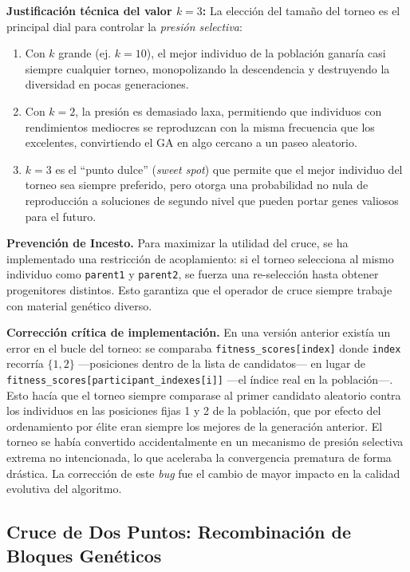 \documentclass[12pt, a4paper]{article}
\begin{document}
\textbf{Justificación técnica del valor $k=3$:} La elección del tamaño del torneo es
el principal dial para controlar la \textit{presión selectiva}:
\begin{enumerate}
    \item Con $k$ grande (ej. $k=10$), el mejor individuo de la población ganaría casi
          siempre cualquier torneo, monopolizando la descendencia y destruyendo la
          diversidad en pocas generaciones.
    \item Con $k=2$, la presión es demasiado laxa, permitiendo que individuos con
          rendimientos mediocres se reproduzcan con la misma frecuencia que los excelentes,
          convirtiendo el GA en algo cercano a un paseo aleatorio.
    \item $k=3$ es el ``punto dulce'' (\textit{sweet spot}) que permite que el mejor
          individuo del torneo sea siempre preferido, pero otorga una probabilidad
          no nula de reproducción a soluciones de segundo nivel que pueden portar
          genes valiosos para el futuro.
\end{enumerate}

\textbf{Prevención de Incesto.} Para maximizar la utilidad del cruce, se ha implementado
una restricción de acoplamiento: si el torneo selecciona al mismo individuo como
\texttt{parent1} y \texttt{parent2}, se fuerza una re-selección hasta obtener progenitores
distintos. Esto garantiza que el operador de cruce siempre trabaje con material
genético diverso.

\textbf{Corrección crítica de implementación.} En una versión anterior existía un error
en el bucle del torneo: se comparaba \texttt{fitness\_scores[index]} donde \texttt{index}
recorría $\{1, 2\}$ ---posiciones dentro de la lista de candidatos--- en lugar de
\texttt{fitness\_scores[participant\_indexes[i]]} ---el índice real en la población---.
Esto hacía que el torneo siempre comparase al primer candidato aleatorio contra los
individuos en las posiciones fijas 1 y 2 de la población, que por efecto del ordenamiento
por élite eran siempre los mejores de la generación anterior. El torneo se había
convertido accidentalmente en un mecanismo de presión selectiva extrema no intencionada,
lo que aceleraba la convergencia prematura de forma drástica. La corrección de este \textit{bug}
fue el cambio de mayor impacto en la calidad evolutiva del algoritmo.

\subsection{Cruce de Dos Puntos: Recombinación de Bloques Genéticos}
\end{document}
